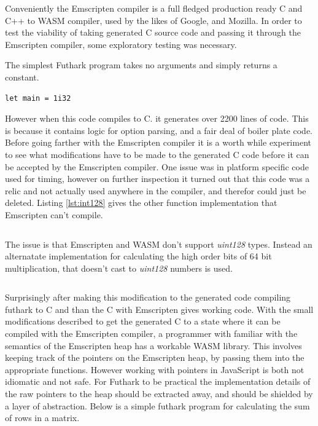 \documentclass[11pt]{book}
\begin{document}
Conveniently the Emscripten compiler is a full fledged production ready C and C++ to WASM compiler, used by the likes of Google, and Mozilla. In order to test the viability of taking generated C source code and passing it through the Emscripten compiler, some exploratory testing was necessary.

The simplest Futhark program takes no arguments and simply returns a constant. 

\begin{verbatim}
let main = 1i32
\end{verbatim}

However when this code compiles to C. it generates over 2200 lines of code. This is because it contains logic for option parsing, and a fair deal of boiler plate code. Before going farther with the Emscripten compiler it is a worth while experiment to see what modifications have to be made to the generated C code before it can be accepted by the Emscripten compiler. One issue was in platform specific code used for timing, however on further inspection it turned out that this code was a relic and not actually used anywhere in the compiler, and therefor could just be deleted. Listing \ref{lst:int128} gives the other function implementation that Emscripten can't compile.
\begin{listing}[H] 
        \inputminted[fontsize=\small,baselinestretch=0.5,linenos]{C}{code/compiler/int128_c.c}
        \label{lst:int128}    
\end{listing} 

The issue is that Emscripten and WASM don't support \textit{uint128} types. Instead an alternatate implementation for calculating the high order bits of 64 bit multiplication, that doesn't cast to \textit{uint128} numbers is used. 

\begin{listing}[H] 
        \inputminted[fontsize=\small,baselinestretch=0.5,linenos]{C}{code/compiler/int128_wasm.c}

        \label{lst:integrate-js}    
\end{listing} 


Surprisingly after making this modification to the generated code compiling futhark to C and than the C with Emscripten gives working code. With the small modifications described to get the generated C to a state where it can be compiled with the Emscripten compiler, a programmer with familiar with the semantics of the Emscripten heap has a workable WASM library. This involves keeping track of the pointers on the Emscripten heap, by passing them into the appropriate functions. However working with pointers in JavaScript is both not idiomatic and not safe. For Futhark to be practical the implementation details of the raw pointers to the heap should be extracted away, and should be shielded by a layer of abstraction.
Below is a simple futhark program for calculating the sum of rows in a matrix. 
\end{document}
